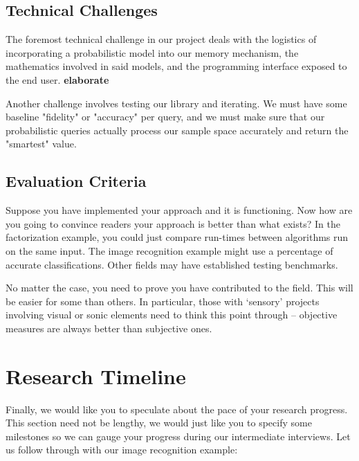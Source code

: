 \documentclass{sig-alternate}
\begin{document}
\subsection{Technical Challenges}
\label{subsec:tech_challenges}
The foremost technical challenge in our project deals with the logistics of incorporating
a probabilistic model into our memory mechanism, the mathematics involved in said models,
and the programming interface exposed to the end user. \textbf{elaborate}

Another challenge involves testing our library and iterating. We must have some  
baseline "fidelity" or "accuracy" per query, and we must make sure that our probabilistic
queries actually process our sample space accurately and return the "smartest" value.



\subsection{Evaluation Criteria}
\label{subsec:eval_criteria}
Suppose you have implemented your approach and it is functioning. Now
how are you going to convince readers your approach is better than
what exists? In the factorization example, you could just compare
run-times between algorithms run on the same input. The image
recognition example might use a percentage of accurate
classifications. Other fields may have established testing benchmarks.

No matter the case, you need to prove you have contributed to the
field. This will be easier for some than others. In particular, those
with `sensory' projects involving visual or sonic elements need to
think this point through -- objective measures are always better than
subjective ones.

\section{Research Timeline}
\label{sec:research_timeline}
Finally, we would like you to speculate about the pace of your
research progress. This section need not be lengthy, we would just
like you to specify some milestones so we can gauge your progress
during our intermediate interviews. Let us follow through with our
image recognition example:
\end{document}
